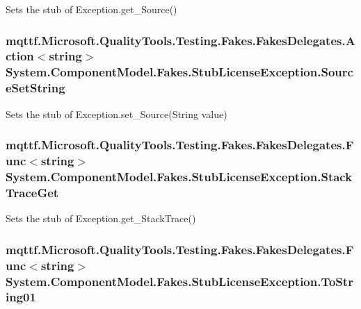Sets the stub of Exception.\-get\-\_\-\-Source()

\hypertarget{class_system_1_1_component_model_1_1_fakes_1_1_stub_license_exception_a937f410f81e315eae4a1212e6471ac7d}{
\subsubsection[{Source\-Set\-String}]{\setlength{\rightskip}{0pt plus 5cm}mqttf.\-Microsoft.\-Quality\-Tools.\-Testing.\-Fakes.\-Fakes\-Delegates.\-Action$<$string$>$ System.\-Component\-Model.\-Fakes.\-Stub\-License\-Exception.\-Source\-Set\-String}}\label{class_system_1_1_component_model_1_1_fakes_1_1_stub_license_exception_a937f410f81e315eae4a1212e6471ac7d}


Sets the stub of Exception.\-set\-\_\-\-Source(\-String value)

\hypertarget{class_system_1_1_component_model_1_1_fakes_1_1_stub_license_exception_aa8b8bfb8c824e43d3e7f79241eb24923}{
\subsubsection[{Stack\-Trace\-Get}]{\setlength{\rightskip}{0pt plus 5cm}mqttf.\-Microsoft.\-Quality\-Tools.\-Testing.\-Fakes.\-Fakes\-Delegates.\-Func$<$string$>$ System.\-Component\-Model.\-Fakes.\-Stub\-License\-Exception.\-Stack\-Trace\-Get}}\label{class_system_1_1_component_model_1_1_fakes_1_1_stub_license_exception_aa8b8bfb8c824e43d3e7f79241eb24923}


Sets the stub of Exception.\-get\-\_\-\-Stack\-Trace()

\hypertarget{class_system_1_1_component_model_1_1_fakes_1_1_stub_license_exception_a68cb7bd9a50efe059e619025b050d48c}{
\subsubsection[{To\-String01}]{\setlength{\rightskip}{0pt plus 5cm}mqttf.\-Microsoft.\-Quality\-Tools.\-Testing.\-Fakes.\-Fakes\-Delegates.\-Func$<$string$>$ System.\-Component\-Model.\-Fakes.\-Stub\-License\-Exception.\-To\-String01}}\label{class_system_1_1_component_model_1_1_fakes_1_1_stub_license_exception_a68cb7bd9a50efe059e619025b050d48c}


